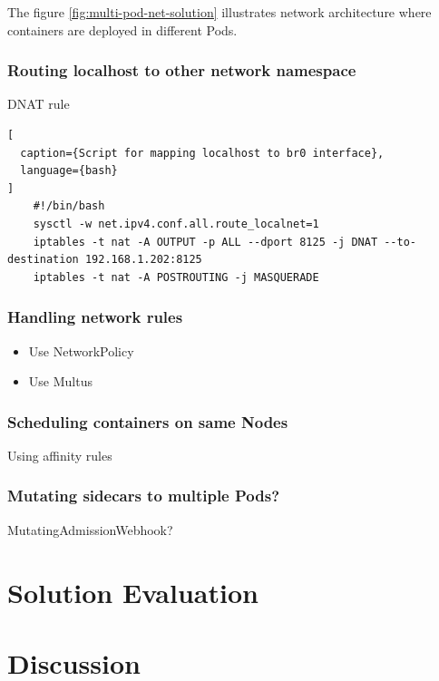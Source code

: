 \documentclass[english, 12pt, a4paper, sci, utf8, a-2b, online]{aaltothesis}
\begin{document}
The figure \ref{fig:multi-pod-net-solution} illustrates network architecture where containers are deployed in different Pods.

\subsubsection{Routing localhost to other network namespace}

DNAT rule

\begin{lstlisting}[
  caption={Script for mapping localhost to br0 interface},
  language={bash}
]
    #!/bin/bash
    sysctl -w net.ipv4.conf.all.route_localnet=1
    iptables -t nat -A OUTPUT -p ALL --dport 8125 -j DNAT --to-destination 192.168.1.202:8125
    iptables -t nat -A POSTROUTING -j MASQUERADE
\end{lstlisting}

\subsubsection{Handling network rules}

\begin{itemize}
  \item Use NetworkPolicy
  \item Use Multus
\end{itemize}

\subsubsection{Scheduling containers on same Nodes}

Using affinity rules

\subsubsection{Mutating sidecars to multiple Pods?}

MutatingAdmissionWebhook?

\clearpage

\section{Solution Evaluation} \label{sec:solution}

\clearpage

\section{Discussion} \label{sec:discussion}
\end{document}
